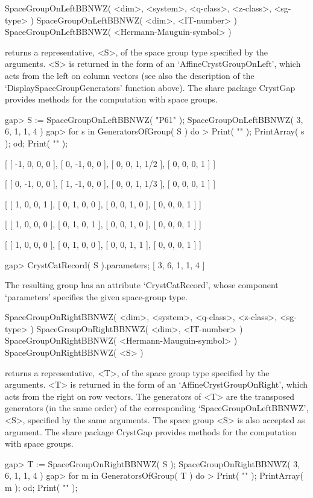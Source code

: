 \>SpaceGroupOnLeftBBNWZ( <dim>, <system>, <q-class>, <z-class>, <sg-type> )
\>SpaceGroupOnLeftBBNWZ( <dim>, <IT-number> )
\>SpaceGroupOnLeftBBNWZ( <Hermann-Mauguin-symbol> )

returns a representative, <S>, of the space group type specified by 
the arguments. <S> is returned in the form of an `AffineCrystGroupOnLeft',
which acts from the left on column vectors (see also the description
of the `DisplaySpaceGroupGenerators' function above). The share package
CrystGap provides methods for the computation with space groups.

\beginexample
gap> S := SpaceGroupOnLeftBBNWZ( "P61" );
SpaceGroupOnLeftBBNWZ( 3, 6, 1, 1, 4 )
gap> for s in GeneratorsOfGroup( S ) do
>  Print( "\n" ); PrintArray( s ); od; Print( "\n" );

[ [   -1,    0,    0,    0 ],
  [    0,   -1,    0,    0 ],
  [    0,    0,    1,  1/2 ],
  [    0,    0,    0,    1 ] ]

[ [    0,   -1,    0,    0 ],
  [    1,   -1,    0,    0 ],
  [    0,    0,    1,  1/3 ],
  [    0,    0,    0,    1 ] ]

[ [  1,  0,  0,  1 ],
  [  0,  1,  0,  0 ],
  [  0,  0,  1,  0 ],
  [  0,  0,  0,  1 ] ]

[ [  1,  0,  0,  0 ],
  [  0,  1,  0,  1 ],
  [  0,  0,  1,  0 ],
  [  0,  0,  0,  1 ] ]

[ [  1,  0,  0,  0 ],
  [  0,  1,  0,  0 ],
  [  0,  0,  1,  1 ],
  [  0,  0,  0,  1 ] ]

gap> CrystCatRecord( S ).parameters;
[ 3, 6, 1, 1, 4 ]
\endexample

The resulting group has an attribute `CrystCatRecord', whose component
`parameters' specifies the given space-group type.

\>SpaceGroupOnRightBBNWZ( <dim>, <system>, <q-class>, <z-class>, <sg-type> )
\>SpaceGroupOnRightBBNWZ( <dim>, <IT-number> )
\>SpaceGroupOnRightBBNWZ( <Hermann-Mauguin-symbol> )
\>SpaceGroupOnRightBBNWZ( <S> )

returns a representative, <T>, of the space group type specified by 
the arguments. <T> is returned in the form of an `AffineCrystGroupOnRight',
which acts from the right on row vectors. The generators of <T> are the 
transposed generators (in the same order) of the corresponding 
`SpaceGroupOnLeftBBNWZ', <S>, specified by the same arguments.
The space group <S> is also accepted as argument. The share package
CrystGap provides methods for the computation with space groups.

\beginexample
gap> T := SpaceGroupOnRightBBNWZ( S );
SpaceGroupOnRightBBNWZ( 3, 6, 1, 1, 4 )
gap> for m in GeneratorsOfGroup( T ) do
>  Print( "\n" ); PrintArray( m ); od; Print( "\n" );
    
